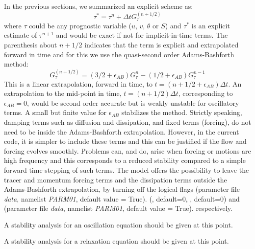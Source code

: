 In the previous sections, we summarized an explicit scheme as:
\begin{equation}
\tau^{*} = \tau^{n} + \Delta t G_\tau^{(n+1/2)}
\label{eq:taustar}
\end{equation}
where $\tau$ could be any prognostic variable ($u$, $v$, $\theta$ or
$S$) and $\tau^*$ is an explicit estimate of $\tau^{n+1}$ and would be
exact if not for implicit-in-time terms. The parenthesis about $n+1/2$
indicates that the term is explicit and extrapolated forward in time
and for this we use the quasi-second order Adams-Bashforth method:
\begin{equation}
G_\tau^{(n+1/2)} = ( 3/2 + \epsilon_{AB}) G_\tau^n
- ( 1/2 + \epsilon_{AB}) G_\tau^{n-1}
\label{eq:adams-bashforth2}
\end{equation}
This is a linear extrapolation, forward in time, to
$t=(n+1/2+{\epsilon_{AB}})\Delta t$. An extrapolation to the mid-point
in time, $t=(n+1/2)\Delta t$, corresponding to $\epsilon_{AB}=0$,
would be second order accurate but is weakly unstable for oscillatory
terms. A small but finite value for $\epsilon_{AB}$ stabilizes the
method. Strictly speaking, damping terms such as diffusion and
dissipation, and fixed terms (forcing), do not need to be inside the
Adams-Bashforth extrapolation. However, in the current code, it is
simpler to include these terms and this can be justified if the flow
and forcing evolves smoothly. Problems can, and do, arise when forcing
or motions are high frequency and this corresponds to a reduced
stability compared to a simple forward time-stepping of such terms.
The model offers the possibility to leave the tracer and momentum 
forcing terms and the dissipation terms outside the 
Adams-Bashforth extrapolation, by turning off the logical flags 
(parameter file {\em data}, namelist {\em PARM01}, default value = True).
(, default=0,
, default=0)
and 
(parameter file {\em data}, namelist {\em PARM01}, default value = True).
respectively.

A stability analysis for an oscillation equation should be given at this point.

A stability analysis for a relaxation equation should be given at this point.

